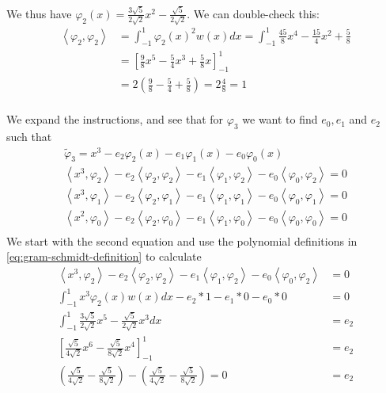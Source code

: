 We thus have $\varphi_2(x) = \frac{3\sqrt{5}}{2\sqrt{2}} x^2 - \frac{\sqrt{5}}{2\sqrt{2}}$. We can double-check this:
\begin{align*}
    \left< \varphi_2, \varphi_2 \right> &= \int_{-1}^1 \varphi_2(x)^2 w(x) dx = \int_{-1}^1 \frac{45}{8} x^4 -\frac{15}{4}x^2 + \frac{5}{8} \\
    &= \left[ \frac{9}{8} x^5 - \frac{5}{4} x^3 + \frac{5}{8} x \right]_{-1}^1 \\
    &= 2\left( \frac{9}{8} - \frac{5}{4} + \frac{5}{8} \right) = 2\frac{4}{8} = 1 \\
\end{align*}

We expand the instructions, and see that for $\varphi_3$ we want to find $e_0, e_1$ and $e_2$ such that
\begin{align*}
    \tilde{\varphi}_3 = x^3 - e_2 \varphi_2(x) - e_1 \varphi_1(x) - e_0 \varphi_0(x) \\
    \left<x^3, \varphi_2 \right> - e_2 \left< \varphi_2, \varphi_2 \right> - e_1 \left< \varphi_1, \varphi_2 \right> - e_0 \left< \varphi_0, \varphi_2 \right> = 0 \\
    \left<x^3, \varphi_1 \right> - e_2 \left< \varphi_2, \varphi_1 \right> - e_1 \left< \varphi_1, \varphi_1 \right> - e_0 \left< \varphi_0, \varphi_1 \right> = 0 \\
    \left<x^2, \varphi_0 \right> - e_2 \left< \varphi_2, \varphi_0 \right> - e_1 \left< \varphi_1, \varphi_0 \right> - e_0 \left< \varphi_0, \varphi_0 \right> = 0 \\
\end{align*}
We start with the second equation and use the polynomial definitions in \eqref{eq:gram-schmidt-definition} to calculate
\begin{align*}
    \left<x^3, \varphi_2 \right> - e_2 \left< \varphi_2, \varphi_2 \right> - e_1 \left< \varphi_1, \varphi_2 \right> - e_0 \left< \varphi_0, \varphi_2 \right> &= 0 \\
    \int_{-1}^1 x^3 \varphi_2(x) w(x) dx - e_2 * 1 - e_1 * 0 - e_0 * 0 &= 0 \\
    \int_{-1}^1 \frac{3\sqrt{5}}{2\sqrt{2}} x^5 - \frac{\sqrt{5}}{2\sqrt{2}} x^3 dx &= e_2 \\
    \left[ \frac{\sqrt{5}}{4\sqrt{2}} x^6 - \frac{\sqrt{5}}{8\sqrt{2}} x^4 \right]_{-1}^1 &= e_2 \\
    (\frac{\sqrt{5}}{4\sqrt{2}} - \frac{\sqrt{5}}{8\sqrt{2}}) - (\frac{\sqrt{5}}{4\sqrt{2}} - \frac{\sqrt{5}}{8\sqrt{2}}) = 0 &= e_2 \\
\end{align*}
